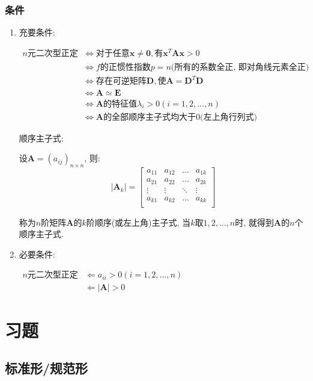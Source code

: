 \subsubsection{条件}
\begin{enumerate}
\item 充要条件: \par $
\begin{aligned}
n\text{元二次型正定} & \Leftrightarrow \text{对于任意}\bm{x}\neq \bm{0}, \text{有}\bm{x}^{T}\bm{A}\bm{x}>0 \\
& \Leftrightarrow f\text{的正惯性指数} p=n\text{(所有的系数全正, 即对角线元素全正)} \\
& \Leftrightarrow \text{存在可逆矩阵} \bm{D}, \text{使} \bm{A}=\bm{D}^{T}\bm{D} \\
& \Leftrightarrow \bm{A}\simeq \bm{E} \\
& \Leftrightarrow \bm{A}\text{的特征值} \lambda_{i}>0(i=1, 2,... ,n) \\
& \Leftrightarrow \bm{A}\text{的全部顺序主子式均大于0(左上角行列式)}
\end{aligned} $ \par
顺序主子式: \par
设$\bm{A}=(a_{ij})_{n\times n}$, 则:
\begin{equation*}
|\bm{A}_{k}|=
\begin{bmatrix}
a_{11} & a_{12} & \dots & a_{1k} \\
a_{21} & a_{22} & \dots & a_{2k} \\
\vdots & \vdots & \ddots & \vdots \\
a_{k1} & a_{k2} & \dots & a_{kk} \\
\end{bmatrix}
\end{equation*} \par
称为$n$阶矩阵$\bm{A}$的$k$阶顺序(或左上角)主子式, 当$k$取$1,2,...,n$时, 就得到$\bm{A}$的$n$个顺序主子式.
\item 必要条件: \par $
\begin{aligned}
n\text{元二次型正定} & \Leftarrow a_{ii}>0(i=1, 2,... ,n) \\
& \Leftarrow \left|\bm{A}\right|>0
\end{aligned} $
\end{enumerate}
\section{习题}
\subsection{标准形/规范形}
